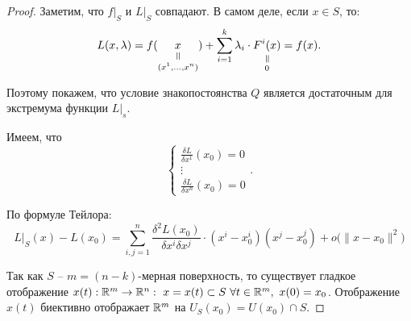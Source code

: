 \begin{proof}
    Заметим, что $f\big|_S$ и $L\big|_S$ совпадают. В самом деле, если $x\in S$, то:
    \[
        L(x,\lambda) = f(\equalto{x}{(x^1,\ldots,x^n)}) + \sum_{i=1}^{k}\lambda_i\cdot \equalto{F^i(x)}{0} = f(x).
    \]

    Поэтому покажем, что условие знакопостоянства $Q$ является достаточным для экстремума функции $L\big|_s$.

    Имеем, что
    \[
        \left\{\begin{array}{l}
            \frac{\delta L}{\delta x^1}(x_0) = 0 \\
            \vdots                               \\
            \frac{\delta L}{\delta x^n}(x_0) = 0
        \end{array}\right..
    \]

    По формуле Тейлора:
    \begin{equation}\label{eq:25}
        L\big|_S(x) - L(x_0) = \sum_{i,j=1}^{n}\frac{\delta^2 L(x_0)}{\delta x^i \delta x^j}\cdot(x^i - x_0^i)(x^j - x_0^j) + o\big(\|x-x_0\|^2\big)
    \end{equation}

    Так как $S$ -- $m=(n-k)$-мерная поверхность, то существует гладкое отображение $x(t):\R^m\rightarrow\R^n: \ x = x(t) \subset S \ \forall t \in \R^m, \ x(0) = x_0$. Отображение $x(t)$ биективно отображает $\mathbb{R}^m$ на $U_S(x_0) = U(x_0)\cap S$.


\end{proof}
